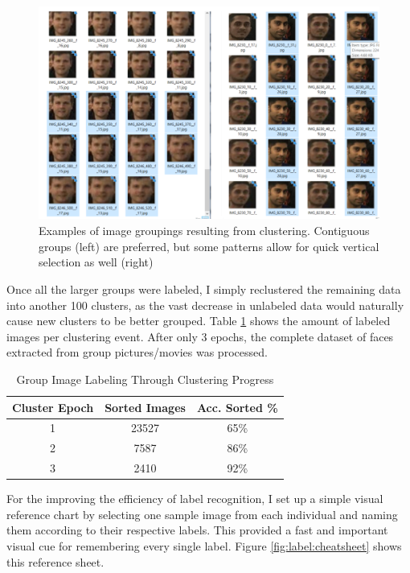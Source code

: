 \documentclass[11pt]{article}
\begin{document}
        \begin{figure}[ht]
            \centering
            \includegraphics[height=7cm]{./Images/labeling/samples.png}
            \caption{Examples of image groupings resulting from clustering. Contiguous groups (left) are preferred, but some patterns allow for quick vertical selection as well (right)}
            \label{fig:label:samples}
        \end{figure}

        Once all the larger groups were labeled, I simply reclustered the remaining data into another 100 clusters, as the vast decrease in unlabeled data would naturally cause new clusters to be better grouped. Table \ref{table:cluster_passes} shows the amount of labeled images per clustering event. After only 3 epochs, the complete dataset of faces extracted from group pictures/movies was processed.

        \begin{table}[h!]
            \centering
            \begin{tabular}{||c c c||}
                \hline
                Cluster Epoch & Sorted Images & Acc. Sorted \% \\ [0.5ex]
                \hline\hline
                1 & 23527 &  65\% \\
                \hline
                2 & 7587 &  86\% \\
                \hline
                3 & 2410 & 92\% \\
                \hline
           \end{tabular}
           \caption{Group Image Labeling Through Clustering Progress}
            \label{table:cluster_passes}
        \end{table}

        For the improving the efficiency of label recognition, I set up a simple visual reference chart by selecting one sample image from each individual and naming them according to their respective labels. This provided a fast and important visual cue for remembering every single label. Figure \ref{fig:label:cheatsheet} shows this reference sheet.
\end{document}
